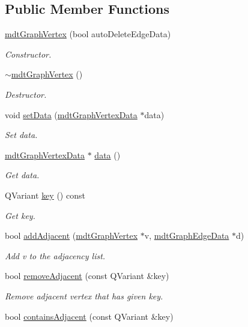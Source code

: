 \subsection*{Public Member Functions}
\begin{DoxyCompactItemize}
\item 
\hyperlink{classmdt_graph_vertex_a6739de6ecb2d69fef17c47f7a690b212}{mdtGraphVertex} (bool autoDeleteEdgeData)
\begin{DoxyCompactList}\small\item\em Constructor. \end{DoxyCompactList}\item 
\hyperlink{classmdt_graph_vertex_ac3d8112c8489cb902f4646f16191e653}{$\sim$mdtGraphVertex} ()
\begin{DoxyCompactList}\small\item\em Destructor. \end{DoxyCompactList}\item 
void \hyperlink{classmdt_graph_vertex_aae20231d82ad4b0bcf0b76e02024508d}{setData} (\hyperlink{classmdt_graph_vertex_data}{mdtGraphVertexData} $\ast$data)
\begin{DoxyCompactList}\small\item\em Set data. \end{DoxyCompactList}\item 
\hyperlink{classmdt_graph_vertex_data}{mdtGraphVertexData} $\ast$ \hyperlink{classmdt_graph_vertex_a0d9473c0c54213ae759aea8a33d008fd}{data} ()
\begin{DoxyCompactList}\small\item\em Get data. \end{DoxyCompactList}\item 
QVariant \hyperlink{classmdt_graph_vertex_abb33e98c2370d5b016c29549a7419951}{key} () const 
\begin{DoxyCompactList}\small\item\em Get key. \end{DoxyCompactList}\item 
bool \hyperlink{classmdt_graph_vertex_ab4a926f860e8c70c827e3e8ef15f558d}{addAdjacent} (\hyperlink{classmdt_graph_vertex}{mdtGraphVertex} $\ast$v, \hyperlink{classmdt_graph_edge_data}{mdtGraphEdgeData} $\ast$d)
\begin{DoxyCompactList}\small\item\em Add v to the adjacency list. \end{DoxyCompactList}\item 
bool \hyperlink{classmdt_graph_vertex_a070a889db874a7a7666dcaaca18e2914}{removeAdjacent} (const QVariant \&key)
\begin{DoxyCompactList}\small\item\em Remove adjacent vertex that has given key. \end{DoxyCompactList}\item 
\hypertarget{classmdt_graph_vertex_a22b79b59fad6a19b52fad5fb353922bd}{
bool \hyperlink{classmdt_graph_vertex_a22b79b59fad6a19b52fad5fb353922bd}{containsAdjacent} (const QVariant \&key)}
\label{classmdt_graph_vertex_a22b79b59fad6a19b52fad5fb353922bd}


\end{DoxyCompactItemize}
